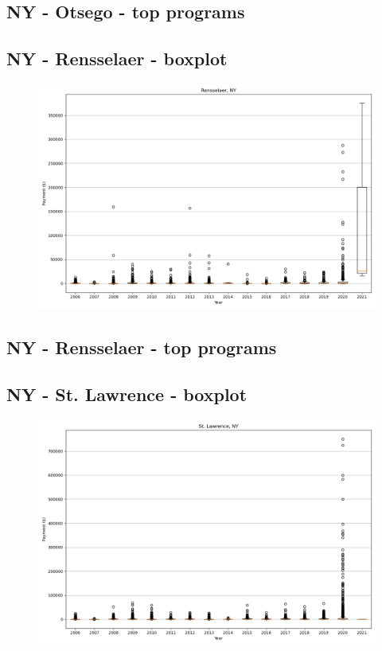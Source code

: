 \subsection*{NY - Otsego - top programs}

\newpage
\subsection*{NY - Rensselaer - boxplot}
\begin{figure}[h]
\centering
\includegraphics[width=7in]{../output/boxplots/counties/Rensselaer-NY_boxplot.png}
\end{figure}


\subsection*{NY - Rensselaer - top programs}

\newpage
\subsection*{NY - St. Lawrence - boxplot}
\begin{figure}[h]
\centering
\includegraphics[width=7in]{../output/boxplots/counties/St. Lawrence-NY_boxplot.png}
\end{figure}


